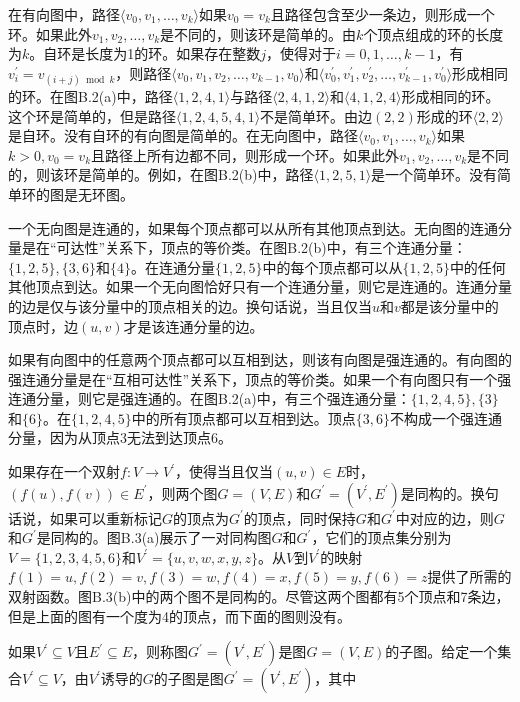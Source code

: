 \documentclass[lang=cn,newtx,10pt,scheme=chinese]{elegantbook}
\begin{document}
在有向图中，路径$\langle v_0, v_1, \ldots, v_k\rangle$如果$v_0=v_k$且路径包含至少一条边，则形成一个环。如果此外$v_1, v_2, \ldots, v_k$是不同的，则该环是简单的。由$k$个顶点组成的环的长度为$k$。自环是长度为1的环。如果存在整数$j$，使得对于$i=0,1,\ldots,k-1$，有$v_i^{\prime}=v_{(i+j) \bmod k}$，则路径$\langle v_0, v_1, v_2, \ldots, v_{k-1}, v_0\rangle$和$\langle v_0^{\prime}, v_1^{\prime}, v_2^{\prime}, \ldots, v_{k-1}^{\prime}, v_0^{\prime}\rangle$形成相同的环。在图B.2(a)中，路径$\langle 1,2,4,1\rangle$与路径$\langle 2,4,1,2\rangle$和$\langle 4,1,2,4\rangle$形成相同的环。这个环是简单的，但是路径$\langle 1,2,4,5,4,1\rangle$不是简单环。由边$(2,2)$形成的环$\langle 2,2\rangle$是自环。没有自环的有向图是简单的。在无向图中，路径$\langle v_0, v_1, \ldots, v_k\rangle$如果$k>0,v_0=v_k$且路径上所有边都不同，则形成一个环。如果此外$v_1,v_2,\ldots,v_k$是不同的，则该环是简单的。例如，在图B.2(b)中，路径$\langle 1,2,5,1\rangle$是一个简单环。没有简单环的图是无环图。

一个无向图是连通的，如果每个顶点都可以从所有其他顶点到达。无向图的连通分量是在“可达性”关系下，顶点的等价类。在图B.2(b)中，有三个连通分量：$\{1,2,5\},\{3,6\}$和$\{4\}$。在连通分量$\{1,2,5\}$中的每个顶点都可以从$\{1,2,5\}$中的任何其他顶点到达。如果一个无向图恰好只有一个连通分量，则它是连通的。连通分量的边是仅与该分量中的顶点相关的边。换句话说，当且仅当$u$和$v$都是该分量中的顶点时，边$(u,v)$才是该连通分量的边。

如果有向图中的任意两个顶点都可以互相到达，则该有向图是强连通的。有向图的强连通分量是在“互相可达性”关系下，顶点的等价类。如果一个有向图只有一个强连通分量，则它是强连通的。在图B.2(a)中，有三个强连通分量：$\{1,2,4,5\},\{3\}$和$\{6\}$。在$\{1,2,4,5\}$中的所有顶点都可以互相到达。顶点$\{3,6\}$不构成一个强连通分量，因为从顶点3无法到达顶点6。

如果存在一个双射$f:V\rightarrow V^{\prime}$，使得当且仅当$(u,v)\in E$时，$(f(u),f(v))\in E^{\prime}$，则两个图$G=(V,E)$和$G^{\prime}=(V^{\prime},E^{\prime})$是同构的。换句话说，如果可以重新标记$G$的顶点为$G^{\prime}$的顶点，同时保持$G$和$G^{\prime}$中对应的边，则$G$和$G^{\prime}$是同构的。图B.3(a)展示了一对同构图$G$和$G^{\prime}$，它们的顶点集分别为$V=\{1,2,3,4,5,6\}$和$V^{\prime}=\{u,v,w,x,y,z\}$。从$V$到$V^{\prime}$的映射$f(1)=u,f(2)=v,f(3)=w,f(4)=x,f(5)=y,f(6)=z$提供了所需的双射函数。图B.3(b)中的两个图不是同构的。尽管这两个图都有5个顶点和7条边，但是上面的图有一个度为4的顶点，而下面的图则没有。

如果$V^{\prime}\subseteq V$且$E^{\prime}\subseteq E$，则称图$G^{\prime}=(V^{\prime},E^{\prime})$是图$G=(V,E)$的子图。给定一个集合$V^{\prime}\subseteq V$，由$V^{\prime}$诱导的$G$的子图是图$G^{\prime}=(V^{\prime},E^{\prime})$，其中
\end{document}
